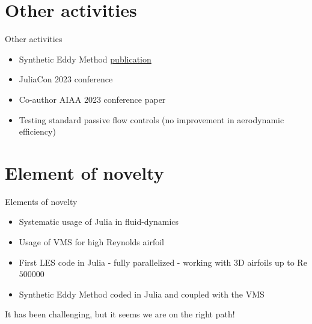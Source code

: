 \documentclass{beamer}
\begin{document}
\section{Other activities}
\begin{frame}{Other activities}
\begin{itemize}
	\item Synthetic Eddy Method \href{https://www.theoj.org/joss-papers/joss.05565/10.21105.joss.05565.pdf}{publication}
	\item JuliaCon 2023 conference
	\item Co-author AIAA 2023 conference paper
\end{itemize}

\begin{itemize}
	\item Testing standard passive flow controls (no improvement in aerodynamic efficiency)
\end{itemize}

\end{frame}



\section{Element of novelty}
\begin{frame}{Elements of novelty}
\begin{itemize}
	\item Systematic usage of Julia in fluid-dynamics
	\item Usage of VMS for high Reynolds airfoil
	\item First LES code in Julia - fully parallelized - working with 3D airfoils up to Re $\num{500000}$ 
	\item Synthetic Eddy Method coded in Julia and coupled with the VMS
\end{itemize}

It has been challenging, but it seems we are on the right path!

\end{frame}
\end{document}

